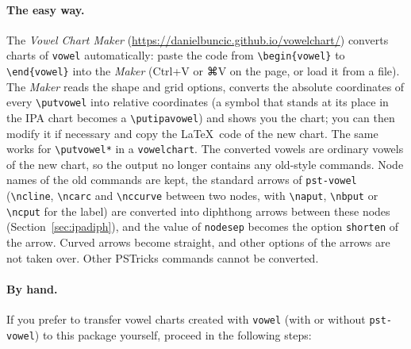 \documentclass[a4paper,11pt]{article}
\newcommand\cmd[1]{\texttt{\textbackslash #1}}
\newcommand\opt[1]{\texttt{#1}}
\newcommand\pkg[1]{\texttt{#1}}
\begin{document}
\paragraph{The easy way.} The \textit{Vowel Chart Maker} (\url{https://danielbuncic.github.io/vowelchart/}) converts charts of \pkg{vowel} automatically: paste the code from \verb|\begin{vowel}| to \verb|\end{vowel}| into the \textit{Maker} (Ctrl+V or ⌘V on the page, or load it from a file). The \textit{Maker} reads the shape and grid options, converts the absolute coordinates of every \cmd{putvowel} into relative coordinates (a symbol that stands at its place in the IPA chart becomes a \cmd{putipavowel}) and shows you the chart; you can then modify it if necessary and copy the \LaTeX\ code of the new chart. The same works for \cmd{putvowel*} in a \texttt{vowelchart}. The converted vowels are ordinary vowels of the new chart, so the output no longer contains any old-style commands. Node names of the old commands are kept, the standard arrows of \pkg{pst-vowel} (\cmd{ncline}, \cmd{ncarc} and \cmd{nccurve} between two nodes, with \cmd{naput}, \cmd{nbput} or \cmd{ncput} for the label) are converted into diphthong arrows between these nodes (Section~\ref{sec:ipadiph}), and the value of \texttt{nodesep} becomes the option \opt{shorten} of the arrow. Curved arrows become straight, and other options of the arrows are not taken over. Other PSTricks commands cannot be converted.

\paragraph{By hand.} If you prefer to transfer vowel charts created with \pkg{vowel} (with or without \pkg{pst-vowel}) to this package yourself, proceed in the following steps:
\end{document}
